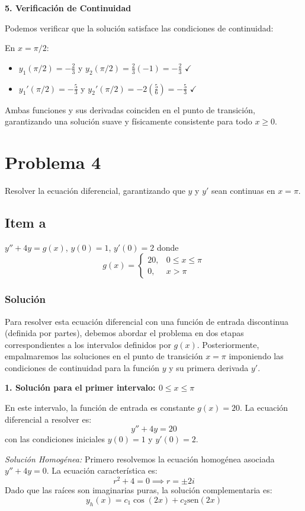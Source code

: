 \documentclass[a4paper]{article}
\begin{document}
\textbf{5. Verificación de Continuidad}

Podemos verificar que la solución satisface las condiciones de continuidad:

En $x = \pi/2$:
\begin{itemize}
    \item $y_1(\pi/2) = -\frac{2}{3}$ y $y_2(\pi/2) = \frac{2}{3}(-1) = -\frac{2}{3}$ $\checkmark$
    \item $y_1'(\pi/2) = -\frac{5}{3}$ y $y_2'(\pi/2) = -2(\frac{5}{6}) = -\frac{5}{3}$ $\checkmark$
\end{itemize}

Ambas funciones y sus derivadas coinciden en el punto de transición, garantizando una solución suave y físicamente consistente para todo $x \geq 0$.

\section{Problema 4}
Resolver la ecuación diferencial, garantizando que $y$ y $y'$ sean continuas en $x = \pi$.

\subsection{Item a}
$y'' + 4y = g(x)$, $y(0) = 1$, $y'(0) = 2$ donde
$$
g(x) = \begin{cases} 
20, & 0 \leq x \leq \pi \\
0, & x > \pi 
\end{cases}
$$

\subsubsection{Solución}
Para resolver esta ecuación diferencial con una función de entrada discontinua (definida por partes), debemos abordar el problema en dos etapas correspondientes a los intervalos definidos por $g(x)$. Posteriormente, empalmaremos las soluciones en el punto de transición $x = \pi$ imponiendo las condiciones de continuidad para la función $y$ y su primera derivada $y'$.

\textbf{1. Solución para el primer intervalo: $0 \leq x \leq \pi$}

En este intervalo, la función de entrada es constante $g(x) = 20$. La ecuación diferencial a resolver es:
$$
y'' + 4y = 20
$$
con las condiciones iniciales $y(0) = 1$ y $y'(0) = 2$.

\textit{Solución Homogénea:}
Primero resolvemos la ecuación homogénea asociada $y'' + 4y = 0$. La ecuación característica es:
$$
r^2 + 4 = 0 \implies r = \pm 2i
$$
Dado que las raíces son imaginarias puras, la solución complementaria es:
$$
y_h(x) = c_1 \cos(2x) + c_2 \text{sen}(2x)
$$
\end{document}
